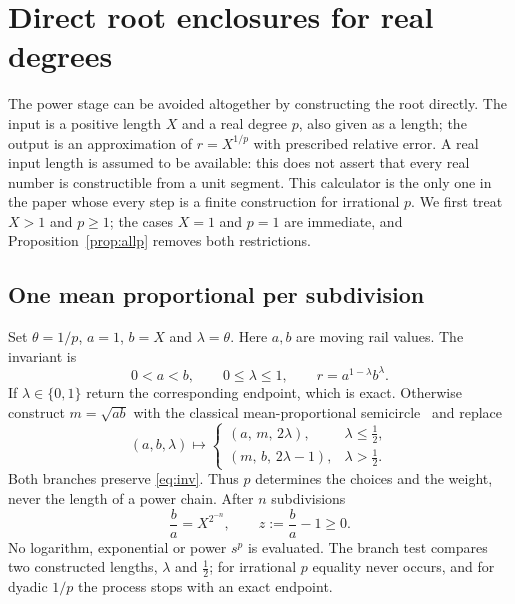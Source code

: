 \section{Direct root enclosures for real degrees}\label{sec:enclosure}

The power stage can be avoided altogether by constructing the root directly. The input is a positive
length $X$ and a real degree $p$, also given as a length; the output is an approximation of
$r=X^{1/p}$ with prescribed relative error. A real input length is assumed to be available: this does
not assert that every real number is constructible from a unit segment. This calculator is the only one in the paper whose every
step is a finite construction for irrational $p$. We first treat $X>1$ and $p\ge1$; the cases $X=1$ and
$p=1$ are immediate, and Proposition~\ref{prop:allp} removes both restrictions.

\subsection{One mean proportional per subdivision}

Set $\theta=1/p$, $a=1$, $b=X$ and $\lambda=\theta$. Here $a,b$ are moving rail values. The invariant is
\begin{equation}\label{eq:inv}
0<a<b,\qquad 0\le\lambda\le1,\qquad r=a^{1-\lambda}b^{\lambda}.
\end{equation}
If $\lambda\in\{0,1\}$ return the corresponding endpoint, which is exact. Otherwise construct
$m=\sqrt{ab}$ with the classical mean-proportional semicircle~\cite{euclid} and replace
\begin{equation}\label{eq:subdiv}
(a,b,\lambda)\longmapsto
\begin{cases}(a,\,m,\,2\lambda),&\lambda\le\tfrac12,\\[2pt](m,\,b,\,2\lambda-1),&\lambda>\tfrac12.\end{cases}
\end{equation}
Both branches preserve \eqref{eq:inv}. Thus $p$ determines the choices and the weight, never the length
of a power chain. After $n$ subdivisions
\begin{equation}\label{eq:gap}
\frac ba=X^{2^{-n}},\qquad z:=\frac ba-1\ge0.
\end{equation}
No logarithm, exponential or power $s^{p}$ is evaluated. The branch test compares two constructed
lengths, $\lambda$ and $\tfrac12$; for irrational $p$ equality never occurs, and for dyadic $1/p$ the
process stops with an exact endpoint.

